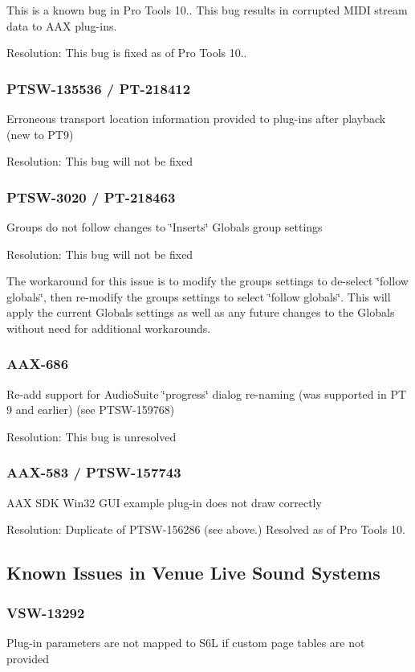 This is a known bug in Pro Tools 10.. This bug results in corrupted M\+I\+DI stream data to A\+AX plug-\/ins.

Resolution\+: This bug is fixed as of Pro Tools 10..\hypertarget{a00846_PTSW-135536}{}\subsubsection{P\+T\+S\+W-\/135536 / P\+T-\/218412}\label{a00846_PTSW-135536}
Erroneous transport location information provided to plug-\/ins after playback (new to P\+T9)

Resolution\+: This bug will not be fixed\hypertarget{a00846_PTSW-3020}{}\subsubsection{P\+T\+S\+W-\/3020 / P\+T-\/218463}\label{a00846_PTSW-3020}
Groups do not follow changes to \char`\"{}\+Inserts\char`\"{} Globals group settings

Resolution\+: This bug will not be fixed

The workaround for this issue is to modify the group\textquotesingle{}s settings to de-\/select \char`\"{}follow globals\char`\"{}, then re-\/modify the group\textquotesingle{}s settings to select \char`\"{}follow globals\char`\"{}. This will apply the current Globals settings as well as any future changes to the Globals without need for additional workarounds.\hypertarget{a00846_AAX-686}{}\subsubsection{A\+A\+X-\/686}\label{a00846_AAX-686}
Re-\/add support for Audio\+Suite \char`\"{}progress\char`\"{} dialog re-\/naming (was supported in PT 9 and earlier) (see P\+T\+S\+W-\/159768)

Resolution\+: This bug is unresolved\hypertarget{a00846_AAX-583}{}\subsubsection{A\+A\+X-\/583 / P\+T\+S\+W-\/157743}\label{a00846_AAX-583}
A\+AX S\+DK Win32 G\+UI example plug-\/in does not draw correctly

Resolution\+: Duplicate of P\+T\+S\+W-\/156286 (see above.) Resolved as of Pro Tools 10.\hypertarget{a00846_knownissues_venue}{}\subsection{Known Issues in Venue Live Sound Systems}\label{a00846_knownissues_venue}
\hypertarget{a00846_VSW-13292}{}\subsubsection{V\+S\+W-\/13292}\label{a00846_VSW-13292}
Plug-\/in parameters are not mapped to S6L if custom page tables are not provided

